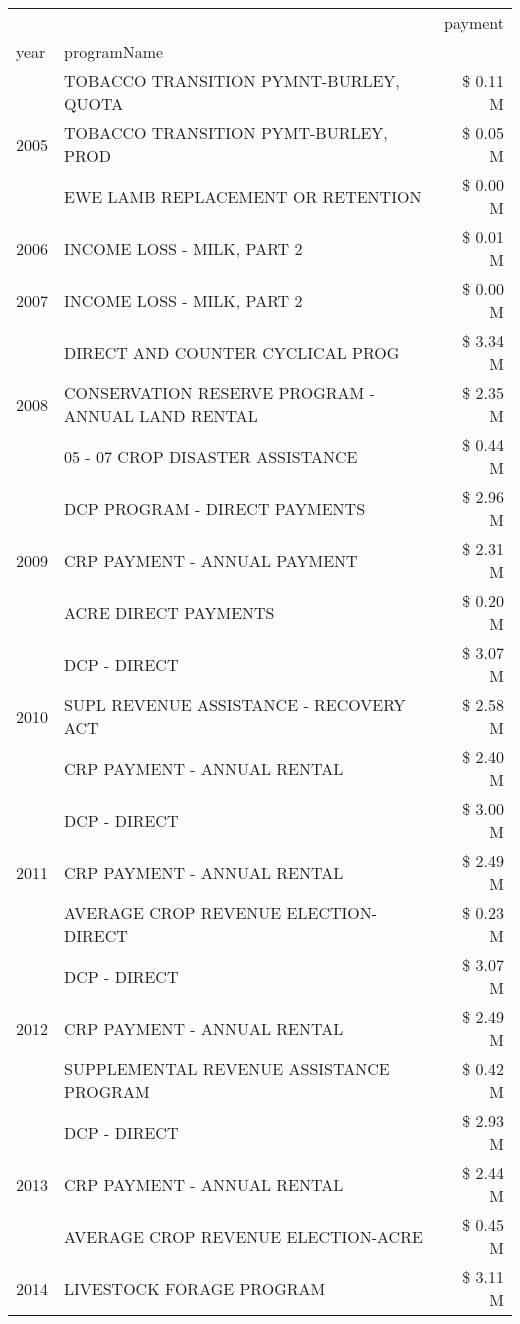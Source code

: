 \begin{tabular}{llr}
\toprule
 &  & payment \\
year & programName &  \\
\midrule
\multirow[t]{3}{*}{2005} & TOBACCO TRANSITION PYMNT-BURLEY, QUOTA & \$ 0.11 M \\
 & TOBACCO TRANSITION PYMT-BURLEY, PROD & \$ 0.05 M \\
 & EWE LAMB REPLACEMENT OR RETENTION & \$ 0.00 M \\
\cline{1-3}
2006 & INCOME LOSS - MILK, PART 2 & \$ 0.01 M \\
\cline{1-3}
2007 & INCOME LOSS - MILK, PART 2 & \$ 0.00 M \\
\cline{1-3}
\multirow[t]{3}{*}{2008} & DIRECT AND COUNTER CYCLICAL PROG & \$ 3.34 M \\
 & CONSERVATION RESERVE PROGRAM - ANNUAL LAND RENTAL & \$ 2.35 M \\
 & 05 - 07 CROP DISASTER ASSISTANCE & \$ 0.44 M \\
\cline{1-3}
\multirow[t]{3}{*}{2009} & DCP PROGRAM - DIRECT PAYMENTS & \$ 2.96 M \\
 & CRP PAYMENT - ANNUAL PAYMENT & \$ 2.31 M \\
 & ACRE DIRECT PAYMENTS & \$ 0.20 M \\
\cline{1-3}
\multirow[t]{3}{*}{2010} & DCP - DIRECT & \$ 3.07 M \\
 & SUPL REVENUE ASSISTANCE - RECOVERY ACT & \$ 2.58 M \\
 & CRP PAYMENT - ANNUAL RENTAL & \$ 2.40 M \\
\cline{1-3}
\multirow[t]{3}{*}{2011} & DCP - DIRECT & \$ 3.00 M \\
 & CRP PAYMENT - ANNUAL RENTAL & \$ 2.49 M \\
 & AVERAGE CROP REVENUE ELECTION-DIRECT & \$ 0.23 M \\
\cline{1-3}
\multirow[t]{3}{*}{2012} & DCP - DIRECT & \$ 3.07 M \\
 & CRP PAYMENT - ANNUAL RENTAL & \$ 2.49 M \\
 & SUPPLEMENTAL REVENUE ASSISTANCE PROGRAM & \$ 0.42 M \\
\cline{1-3}
\multirow[t]{3}{*}{2013} & DCP - DIRECT & \$ 2.93 M \\
 & CRP PAYMENT - ANNUAL RENTAL & \$ 2.44 M \\
 & AVERAGE CROP REVENUE ELECTION-ACRE & \$ 0.45 M \\
\cline{1-3}
\multirow[t]{3}{*}{2014} & LIVESTOCK FORAGE PROGRAM & \$ 3.11 M \\

\end{tabular}
